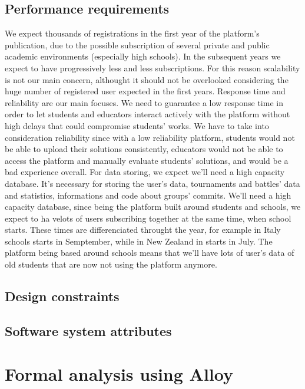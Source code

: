 \documentclass{article}
\begin{document}
{    \subsection{Performance requirements}
        We expect thousands of registrations in the first year of the platform's publication, due to the possible
        subscription of several private and public academic environments (especially high schools).
        In the subsequent years we expect to have progressively less and less subscriptions. For this reason scalability
        is not our main concern, althought it should not be overlooked considering the huge number of registered
        user expected in the first years. Response time and reliability are our main focuses.
        We need to guarantee a low response time in order to let students and educators interact actively with the platform
        without high delays that could compromise students' works. 
        We have to take into consideration reliability since with a low reliability platform, students would not be able to upload their solutions consistently,
        educators would not be able to access the platform and manually evaluate students' solutions, and would be a bad experience overall.
        For data storing, we expect we'll need a high capacity database. It's necessary for storing
        the user's data, tournaments and battles' data and statistics, informations and code about groups' commits.
        We'll need a high capacity database, since being the platform built around students and schools, we expect to ha velots of users subscribing together
        at the same time, when school starts. These times are differenciated throught the year, for example in Italy schools starts in Semptember, while in 
        New Zealand in starts in July. The platform being based around schools means that we'll have  lots of user's data of old students that are now not using 
        the platform anymore.
\subsection{Design constraints}
\subsection{Software system attributes}

\newpage
\pagestyle{FormalAnalysisAlloyStyle}

\section{Formal analysis using Alloy}


}
\end{document}
